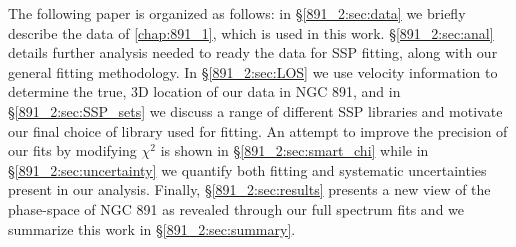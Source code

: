 The following paper is organized as follows: in \S\ref{891_2:sec:data} we
briefly describe the data of \ref{chap:891_1}, which is used
in this work. \S\ref{891_2:sec:anal} details further analysis needed to
ready the data for SSP fitting, along with our general fitting
methodology. In \S\ref{891_2:sec:LOS} we use velocity information to
determine the true, 3D location of our data in NGC 891, and in
\S\ref{891_2:sec:SSP_sets} we discuss a range of different SSP libraries and
motivate our final choice of library used for fitting. An attempt to
improve the precision of our fits by modifying $\chi^2$ is shown in
\S\ref{891_2:sec:smart_chi} while in \S\ref{891_2:sec:uncertainty} we quantify
both fitting and systematic uncertainties present in our
analysis. Finally, \S\ref{891_2:sec:results} presents a new view of the
phase-space of NGC 891 as revealed through our full spectrum fits and
we summarize this work in \S\ref{891_2:sec:summary}.

